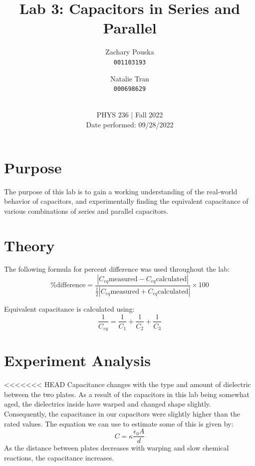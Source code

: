 \documentclass[titlepage]{article}
\begin{document}
\title{\textbf{Lab 3: Capacitors in Series and Parallel}}
\author{
    Zachary Pouska\\
    \texttt{001103193}\\
    \and
    Natalie Tran \\ 
    \texttt{000698629}\\ \\
} 

\date{PHYS 236 | Fall 2022\\
Date performed: 09/28/2022}


	\maketitle



	\section{Purpose}
    The purpose of this lab is to gain a working understanding of the real-world behavior of capacitors, and experimentally finding the equivalent capacitance of various combinations of series and parallel capacitors.

	\section{Theory}	

    The following formula for percent difference was used throughout the lab: $$\text{\% difference} = \frac{|C_{eq}\text{measured} - C_{eq}\text{calculated} |}{\frac{1}{2} |C_{eq}\text{measured} + C_{eq}\text{calculated}|} \times 100$$

    Equivalent capacitance is calculated using: 
    $$\frac{1}{C_{eq}} = \frac{1}{C_1}+\frac{1}{C_2} + \frac{1}{C_3}
    $$




	\section{Experiment Analysis}
<<<<<<< HEAD
    Capacitance changes with the type and amount of dielectric between the two plates. As a result of the capacitors in this lab being somewhat aged, the dielectrics inside have warped and changed shape slightly. Consequently, the capacitance in our capacitors were slightly higher than the rated values. The equation we can use to estimate some of this is given by: $$ C=\kappa \frac{\epsilon _0 A}{d}$$
    As the distance between plates decreases with warping and slow chemical reactions, the capacitance increases.
\end{document}
